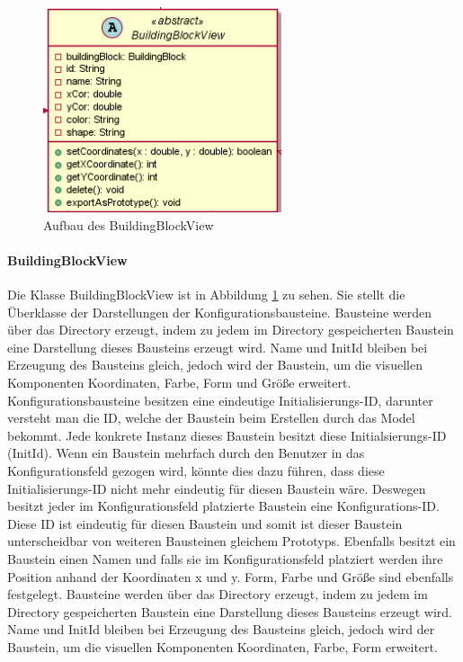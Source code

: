 \documentclass[parskip=full]{scrartcl}
\begin{document}
\newpage

\begin{figure}[htbp]
	\begin{center}
		\includegraphics[width = 7cm]{Grafiken/View/BuildingBlockView.png}
		\caption{Aufbau des BuildingBlockView}
		\label{BuildingBlockView}
	\end{center}
\end{figure}

\paragraph{BuildingBlockView}


Die Klasse BuildingBlockView ist in Abbildung \ref{BuildingBlockView} zu sehen. Sie stellt die Überklasse der Darstellungen der Konfigurationsbausteine.
Bausteine werden über das Directory erzeugt, indem zu jedem im Directory gespeicherten Baustein eine Darstellung dieses Bausteins erzeugt wird. Name und InitId bleiben bei Erzeugung des Bausteins gleich, jedoch wird der Baustein, um die visuellen Komponenten Koordinaten, Farbe, Form und Größe erweitert.
Konfigurationsbausteine besitzen eine eindeutige Initialisierungs-ID, darunter versteht man die ID, welche der Baustein beim Erstellen durch das Model bekommt. Jede konkrete Instanz dieses Baustein besitzt diese Initialsierungs-ID (InitId). Wenn ein Baustein mehrfach durch den Benutzer in das Konfigurationsfeld gezogen wird, könnte dies dazu führen, dass diese Initialisierungs-ID nicht mehr eindeutig für diesen Baustein wäre. Deswegen besitzt jeder im Konfigurationsfeld platzierte Baustein eine Konfigurations-ID. Diese ID ist eindeutig für diesen Baustein und somit ist dieser Baustein unterscheidbar von weiteren Bausteinen gleichem Prototyps. Ebenfalls besitzt ein Baustein einen Namen und falls sie im Konfigurationsfeld platziert werden ihre Position anhand der Koordinaten x und y. Form, Farbe und Größe sind ebenfalls festgelegt.  
Bausteine werden über das Directory erzeugt, indem zu jedem im Directory gespeicherten Baustein eine Darstellung dieses Bausteins erzeugt wird. Name und InitId bleiben bei Erzeugung des Bausteins gleich, jedoch wird der Baustein, um die visuellen Komponenten Koordinaten, Farbe, Form erweitert.
\end{document}
